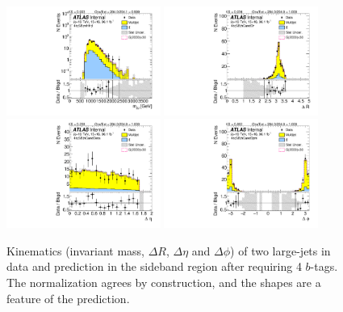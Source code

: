 \begin{figure}[htbp!]
\begin{center}
\includegraphics[width=0.45\textwidth,angle=-90]{figures/boosted/Sideband/b77_FourTag_Sideband_mHH_l_1.pdf}
\includegraphics[width=0.45\textwidth,angle=-90]{figures/boosted/Sideband/b77_FourTag_Sideband_hCandDr.pdf}\\
\includegraphics[width=0.45\textwidth,angle=-90]{figures/boosted/Sideband/b77_FourTag_Sideband_hCandDeta.pdf}
\includegraphics[width=0.45\textwidth,angle=-90]{figures/boosted/Sideband/b77_FourTag_Sideband_hCandDphi.pdf}
  \caption{Kinematics (invariant mass, $\Delta R$, $\Delta \eta$ and $\Delta \phi$) of two large-\R jets in data and prediction in the sideband region after requiring 4 $b$-tags. The normalization agrees by construction, and the shapes are a feature of the prediction. }
  \label{fig:boosted-4b-sideband-ak10-system}
\end{center}
\end{figure}

